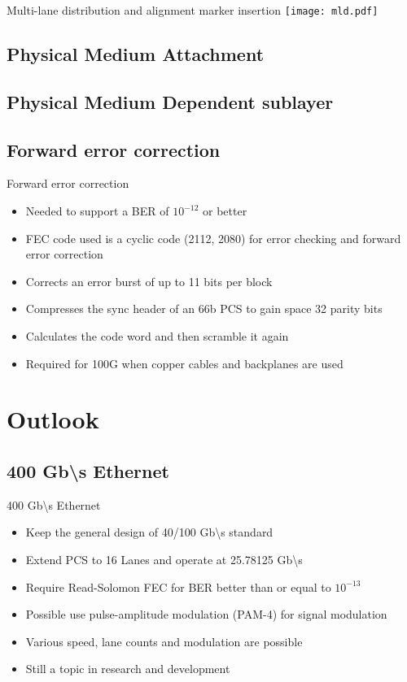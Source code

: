 \documentclass[fleqn,11pt,aspectratio=169]{beamer}
\begin{document}
\begin{frame}{Multi-lane distribution and alignment marker insertion}
\texttt{[image: mld.pdf]}

\end{frame}

\subsection{Physical Medium Attachment}

\subsection{Physical Medium Dependent sublayer}
\subsection{Forward error correction}
\begin{frame}{Forward error correction}
\begin{itemize}
\item  Needed to support a BER  of $10^{-12}$ or better
\item FEC code used is a cyclic code (2112, 2080) for error checking and forward error correction
\item Corrects an error burst of up to 11 bits per block
\item Compresses the sync header of an 66b PCS to gain space 32 parity bits
\item Calculates the code word and then scramble it again
\item Required for 100G when copper cables and backplanes are used
\end{itemize}
\end{frame}

\section{Outlook}
\subsection{400 Gb\textbackslash s Ethernet}
\begin{frame}{400 Gb\textbackslash s Ethernet}
\begin{itemize}
  \item Keep the general design of 40/100 Gb\textbackslash s standard
  \item Extend PCS to 16 Lanes and operate at 25.78125 Gb\textbackslash s
  \item Require Read-Solomon FEC for BER better than or equal to $10^{-13}$
  \item Possible use pulse-amplitude modulation (PAM-4) for signal modulation
  \item Various speed, lane counts and modulation are possible
  \item Still a topic in research and development
\end{itemize}
\end{frame}
\end{document}
